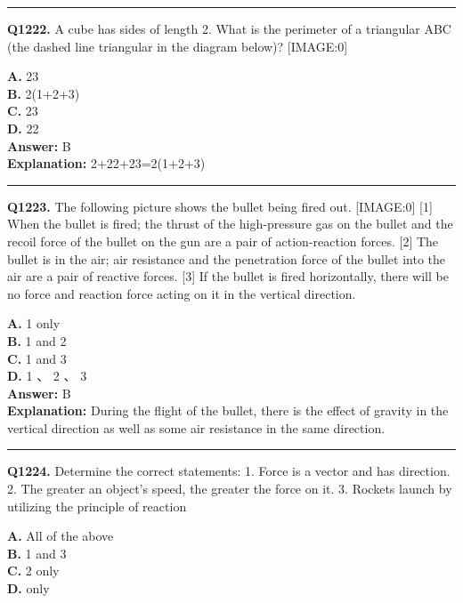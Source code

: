 \documentclass[12pt]{article}
\begin{document}
\hrule
\vspace{1em}


\noindent
\textbf{Q1222.} A cube has sides of length 2. What is the perimeter of a triangular ABC (the dashed line triangular in the diagram below)?
[IMAGE:0]



\textbf{A.} 2\sqrt{}3 \\
\textbf{B.} 2(1+\sqrt{}2+\sqrt{}3) \\
\textbf{C.} 2\sqrt{}3 \\
\textbf{D.} 2\sqrt{}2 \\

\textbf{Answer:} B \\
\textbf{Explanation:} 2+2\sqrt{}2+2\sqrt{}3=2(1+\sqrt{}2+\sqrt{}3)

\hrule
\vspace{1em}


\noindent
\textbf{Q1223.} The following picture shows the bullet being fired out.
[IMAGE:0]
[1]
When the bullet is fired; the thrust of the high-pressure gas on the bullet and the recoil force of the bullet on the gun are a pair of action-reaction forces.
[2]
The bullet is in the air; air resistance and the penetration force of the bullet into the air are a pair of reactive forces.
[3]
If the bullet is fired horizontally, there will be no force and reaction force acting on it in the vertical direction.



\textbf{A.} 1 only \\
\textbf{B.} 1 and 2 \\
\textbf{C.} 1 and 3 \\
\textbf{D.} 1
、
2
、
3 \\

\textbf{Answer:} B \\
\textbf{Explanation:} During the flight of the bullet, there is the effect of gravity in the vertical direction as well as some air resistance in the same direction.

\hrule
\vspace{1em}


\noindent
\textbf{Q1224.} Determine the correct statements:
1.
Force is a vector and has direction.
2.
The greater an object’s speed, the greater the force on it.
3.
Rockets launch by utilizing the principle of reaction



\textbf{A.} All of the above \\
\textbf{B.} 1 and 3 \\
\textbf{C.} 2 only \\
\textbf{D.} only \\
\end{document}

